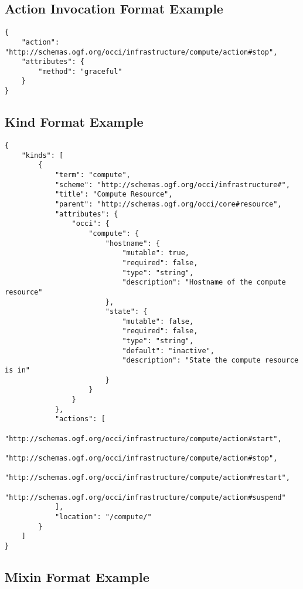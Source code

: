 \documentclass[10pt,a4paper]{article}
\begin{document}
\subsection{Action Invocation Format Example}
\label{sec:example_action_invocation}

\begin{lstlisting}
{
    "action": "http://schemas.ogf.org/occi/infrastructure/compute/action#stop",
    "attributes": {
        "method": "graceful"       
    }
}
\end{lstlisting}

\subsection{Kind Format Example}
\label{sec:example_kind}

\begin{lstlisting}
{
    "kinds": [
        {
            "term": "compute",
            "scheme": "http://schemas.ogf.org/occi/infrastructure#",
            "title": "Compute Resource",
            "parent": "http://schemas.ogf.org/occi/core#resource",
            "attributes": {
                "occi": {
                    "compute": {
                        "hostname": {
                            "mutable": true,
                            "required": false,
                            "type": "string",
                            "description": "Hostname of the compute resource"
                        },
                        "state": {
                            "mutable": false,
                            "required": false,
                            "type": "string",
                            "default": "inactive",
                            "description": "State the compute resource is in"
                        }
                    }
                }
            },
            "actions": [
                "http://schemas.ogf.org/occi/infrastructure/compute/action#start",
                "http://schemas.ogf.org/occi/infrastructure/compute/action#stop",
                "http://schemas.ogf.org/occi/infrastructure/compute/action#restart",
                "http://schemas.ogf.org/occi/infrastructure/compute/action#suspend"
            ],
            "location": "/compute/"
        }
    ]
}
\end{lstlisting}

\subsection{Mixin Format Example}
\label{sec:example_mixin}
\end{document}
